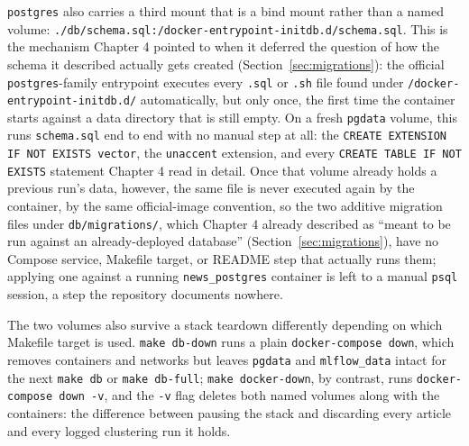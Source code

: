 \begin{sloppypar}
\texttt{postgres} also carries a third mount that is a bind mount rather than a named volume: \texttt{./db/\allowbreak schema.sql:/\allowbreak docker-entrypoint-initdb.d/\allowbreak schema.sql}. This is the mechanism Chapter 4 pointed to when it deferred the question of how the schema it described actually gets created (Section~\ref{sec:migrations}): the official \texttt{postgres}-family entrypoint executes every \texttt{.sql} or \texttt{.sh} file found under \texttt{/docker-entrypoint-initdb.d/} automatically, but only once, the first time the container starts against a data directory that is still empty. On a fresh \texttt{pgdata} volume, this runs \texttt{schema.sql} end to end with no manual step at all: the \texttt{CREATE EXTENSION IF NOT EXISTS vector}, the \texttt{unaccent} extension, and every \texttt{CREATE TABLE IF NOT EXISTS} statement Chapter 4 read in detail. Once that volume already holds a previous run's data, however, the same file is never executed again by the container, by the same official-image convention, so the two additive migration files under \texttt{db/\allowbreak migrations/}, which Chapter 4 already described as ``meant to be run against an already-deployed database'' (Section~\ref{sec:migrations}), have no Compose service, Makefile target, or README step that actually runs them; applying one against a running \texttt{news\_postgres} container is left to a manual \texttt{psql} session, a step the repository documents nowhere.
\end{sloppypar}

\begin{sloppypar}
The two volumes also survive a stack teardown differently depending on which Makefile target is used. \texttt{make db-down} runs a plain \texttt{docker-compose down}, which removes containers and networks but leaves \texttt{pgdata} and \texttt{mlflow\_data} intact for the next \texttt{make db} or \texttt{make db-full}; \texttt{make docker-down}, by contrast, runs \texttt{docker-compose down -v}, and the \texttt{-v} flag deletes both named volumes along with the containers: the difference between pausing the stack and discarding every article and every logged clustering run it holds.
\end{sloppypar}

